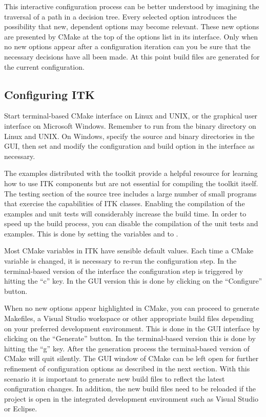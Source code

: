 This interactive configuration process can be better understood by imagining
the traversal of a path in a decision tree. Every selected option introduces the
possibility that new, dependent options may become relevant. These new options
are presented by CMake at the top of the options list in its interface. Only
when no new options appear after a configuration iteration can you be sure that
the necessary decisions have all been made. At this point build files are
generated for the current configuration.

\subsection{Configuring ITK}
\label{sec:ConfigureITK}


Start terminal-based CMake interface  on Linux and UNIX, or the
graphical user interface  on Microsoft Windows. Remember to run
 from the binary directory on Linux and UNIX. On Windows, specify
the source and binary directories in the GUI, then set and modify the
configuration and build option in the interface as necessary.

The examples distributed with the toolkit provide a helpful resource for
learning how to use ITK components but are not essential for compiling the
toolkit itself. The testing section of the source tree includes a large number
of small programs that exercise the capabilities of ITK classes. Enabling the
compilation of the examples and unit tests will considerably increase the build
time. In order to speed up the build process, you can disable the compilation of
the unit tests and examples. This is done by setting the variables
 and  to .

Most CMake variables in ITK have sensible default values. Each time a CMake
variable is changed, it is necessary to re-run the configuration step. In the
terminal-based version of the interface the configuration step is triggered by
hitting the ``c'' key. In the GUI version this is done by clicking on the
``Configure'' button.

When no new options appear highlighted in CMake, you can proceed to generate
Makefiles, a Visual Studio workspace or other appropriate build files depending
on your preferred development environment. This is done in the GUI interface by
clicking on the ``Generate'' button. In the terminal-based version this is done
by hitting the ``g'' key. After the generation process the terminal-based
version of CMake will quit silently. The GUI window of CMake can be left open
for further refinement of configuration options as described in the next
section. With this scenario it is important to generate new build files to
reflect the latest configuration changes. In addition, the new build files need
to be reloaded if the project is open in the integrated development environment
such as Visual Studio or Eclipse.


